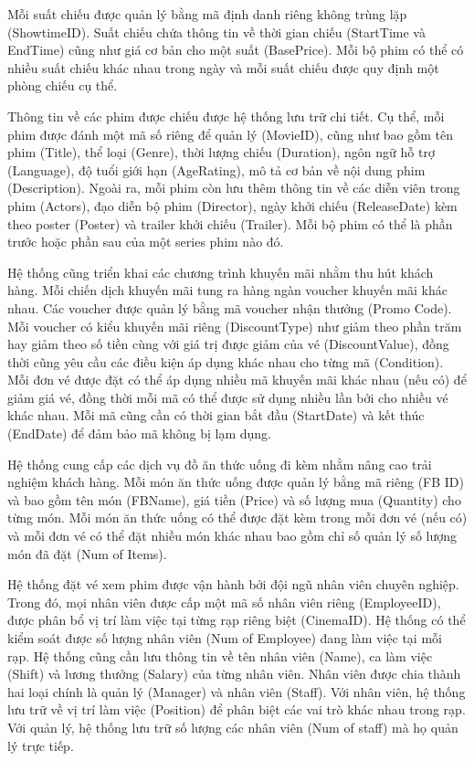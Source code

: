 \documentclass[a4paper]{article}
\begin{document}
Mỗi suất chiếu được quản lý bằng mã định danh riêng không trùng lặp (ShowtimeID). 
Suất chiếu chứa thông tin về thời gian chiếu (StartTime và EndTime) cũng như giá cơ bản cho một suất (BasePrice). 
Mỗi bộ phim có thể có nhiều suất chiếu khác nhau trong ngày và mỗi suất chiếu được quy định một phòng chiếu cụ thể.

Thông tin về các phim được chiếu được hệ thống lưu trữ chi tiết. 
Cụ thể, mỗi phim được đánh một mã số riêng để quản lý (MovieID), cũng như bao gồm tên phim (Title), thể loại (Genre), thời lượng chiếu (Duration), ngôn ngữ hỗ trợ (Language), độ tuổi giới hạn (AgeRating), mô tả cơ bản về nội dung phim (Description). 
Ngoài ra, mỗi phim còn lưu thêm thông tin về các diễn viên trong phim (Actors), đạo diễn bộ phim (Director), ngày khởi chiếu (ReleaseDate) kèm theo poster (Poster) và trailer khởi chiếu (Trailer). 
Mỗi bộ phim có thể là phần trước hoặc phần sau của một series phim nào đó. 

Hệ thống cũng triển khai các chương trình khuyến mãi nhằm thu hút khách hàng. 
Mỗi chiến dịch khuyến mãi tung ra hàng ngàn voucher khuyến mãi khác nhau. 
Các voucher được quản lý bằng mã voucher nhận thưởng (Promo Code). 
Mỗi voucher có kiểu khuyến mãi riêng (DiscountType) như giảm theo phần trăm hay giảm theo số tiền cùng với giá trị được giảm của vé (DiscountValue), đồng thời cũng yêu cầu các điều kiện áp dụng khác nhau cho từng mã (Condition). 
Mỗi đơn vé được đặt có thể áp dụng nhiều mã khuyến mãi khác nhau (nếu có) để giảm giá vé, đồng thời mỗi mã có thể được sử dụng nhiều lần bởi cho nhiều vé khác nhau. 
Mỗi mã cũng cần có thời gian bắt đầu (StartDate) và kết thúc (EndDate) để đảm bảo mã không bị lạm dụng.

Hệ thống cung cấp các dịch vụ đồ ăn thức uống đi kèm nhằm nâng cao trải nghiệm khách hàng. 
Mỗi món ăn thức uống được quản lý bằng mã riêng (FB ID) và bao gồm tên món (FBName), giá tiền (Price) và số lượng mua (Quantity) cho từng món.
Mỗi món ăn thức uống có thể được đặt kèm trong mỗi đơn vé (nếu có) và mỗi đơn vé có thể đặt nhiều món khác nhau bao gồm chỉ số quản lý số lượng món đã đặt (Num of Items). 

Hệ thống đặt vé xem phim được vận hành bởi đội ngũ nhân viên chuyên nghiệp. 
Trong đó, mọi nhân viên được cấp một mã số nhân viên riêng (EmployeeID), được phân bổ vị trí làm việc tại từng rạp riêng biệt (CinemaID). 
Hệ thống có thể kiểm soát được số lượng nhân viên (Num of Employee) đang làm việc tại mỗi rạp.
Hệ thống cũng cần lưu thông tin về tên nhân viên (Name), ca làm việc (Shift) và lương thưởng (Salary) của từng nhân viên. 
Nhân viên được chia thành hai loại chính là quản lý (Manager) và nhân viên (Staff). 
Với nhân viên, hệ thống lưu trữ về vị trí làm việc (Position) để phân biệt các vai trò khác nhau trong rạp.
Với quản lý, hệ thống lưu trữ số lượng các nhân viên (Num of staff) mà họ quản lý trực tiếp. 
\end{document}
